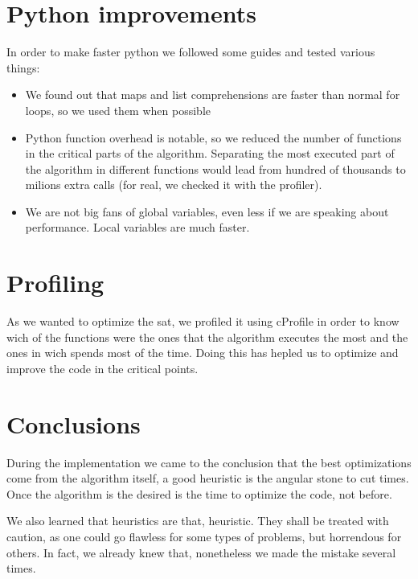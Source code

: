 \documentclass{article}
\begin{document}
\section{Python improvements}
In order to make faster python we followed some guides and tested various things:
\begin{itemize}
	\item We found out that maps and list comprehensions are faster than normal for loops, so we used
	them when possible
	\item Python function overhead is notable, so we reduced the number of functions in the critical
	parts of the algorithm. Separating the most executed part of the algorithm in different functions 
	would lead from hundred of thousands to milions extra calls (for real, we checked it with the
	profiler).
	\item We are not big fans of global variables, even less if we are speaking about performance. Local
	variables are much faster.
\end{itemize} 
%
\section{Profiling}
%
As we wanted to optimize the sat, we profiled it using cProfile in order to know wich of the functions were the ones that the algorithm executes the most and the ones in wich spends most of the time. Doing this has hepled us to optimize and improve the code in the critical points.
\section{Conclusions}
During the implementation we came to the conclusion that the best optimizations come from the algorithm
itself, a good heuristic is the angular stone to cut times. 
Once the algorithm is the desired is the time to optimize the code, not before.

We also learned that heuristics are that, heuristic. They shall be treated with caution, as one could
go flawless for some types of problems, but horrendous for others. In fact, we already knew that, nonetheless
we made the mistake several times.
\end{document}

